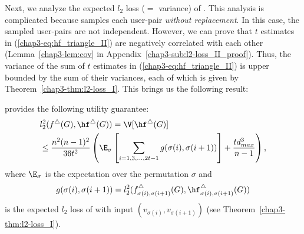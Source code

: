 Next, we analyze the expected $l_2$ loss ($=$ variance) of \AlgWSTri{}. 
This analysis is complicated because \AlgWSTri{} samples each user-pair \textit{without replacement}. 
In this case, the sampled user-pairs are not independent. 
However, we can prove that 
$t$ estimates in (\ref{chap3-eq:hf_triangle_II}) are negatively correlated with each other (Lemma~\ref{chap3-lem:cov} in Appendix~\ref{chap3-sub:l2-loss_II_proof}). 
Thus, the variance of the sum of $t$ estimates 
in (\ref{chap3-eq:hf_triangle_II}) is upper bounded by the sum of their variances, each of which is given by Theorem~\ref{chap3-thm:l2-loss_I}. 
This brings us the following result: 

\begin{theorem}
\label{chap3-thm:l2-loss_II}
\AlgWSTri{} provides the following utility guarantee:
\begin{align}
& l_2^2(f^\triangle(G), \hf^\triangle(G)) = \V[\hf^\triangle(G)] \nonumber\\ 
& \leq \frac{n^2(n-1)^2}{36t^2} \left(\E_\sigma \left[ \sum_{i=1, 3, \ldots, 2t-1} 
g(\sigma(i),\sigma(i+1)) \right] + \frac{t d_{max}^3}{n-1}\right), \label{chap3-eq:thm:l2_II}
\end{align}
where $\E_\sigma$ is the expectation over the permutation $\sigma$ and 
\begin{align}
g(\sigma(i),\sigma(i+1)) = l_2^2(f_{\sigma(i),\sigma(i+1)}^\triangle(G), \hf_{\sigma(i),\sigma(i+1)}^\triangle(G)) 
\label{chap3-eq:thm:g}
\end{align}
is the expected $l_2$ loss of \AlgWSLE{} with input $(v_{\sigma(i)},v_{\sigma(i+1)})$ (see Theorem~\ref{chap3-thm:l2-loss_I}). 
\end{theorem}


